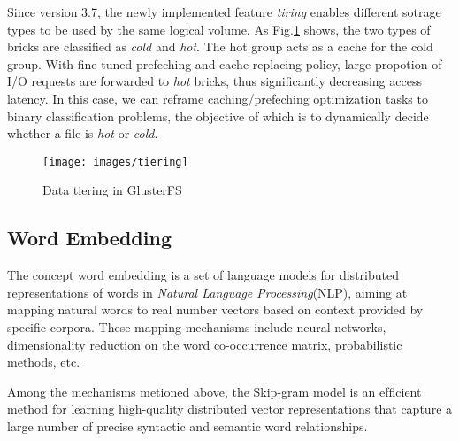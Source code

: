 \documentclass[conference]{IEEEtran}
\begin{document}
Since version 3.7, the newly implemented feature \textit{tiring} enables different sotrage types to be used by the same logical volume.
As Fig.\ref{fig:tiering} shows, the two types of bricks are classified as \textit{cold} and \textit{hot}. The hot group acts as a cache for the cold group. 
With fine-tuned prefeching and cache replacing policy, large propotion of I/O requests are forwarded to \textit{hot} bricks, thus significantly decreasing access latency.
In this case, we can reframe caching/prefeching optimization tasks to binary classification problems,
the objective of which is to dynamically decide whether a file is \textit{hot} or \textit{cold}.

\begin{figure}
\centering
\texttt{[image: images/tiering]}
\caption{Data tiering in GlusterFS}
\label{fig:tiering}
\end{figure}

\subsection{Word Embedding}
The concept word embedding is a set of language models for distributed representations of words in \textit{Natural Language Processing}(NLP), 
aiming at mapping natural words to real number vectors based on context provided by specific corpora.
These mapping mechanisms include neural networks, dimensionality reduction on the word co-occurrence matrix, probabilistic methods, etc.

Among the mechanisms metioned above, the Skip-gram model is an efﬁcient method for learning high-quality distributed vector representations that capture a large number of precise syntactic and semantic word relationships.

\end{document}
